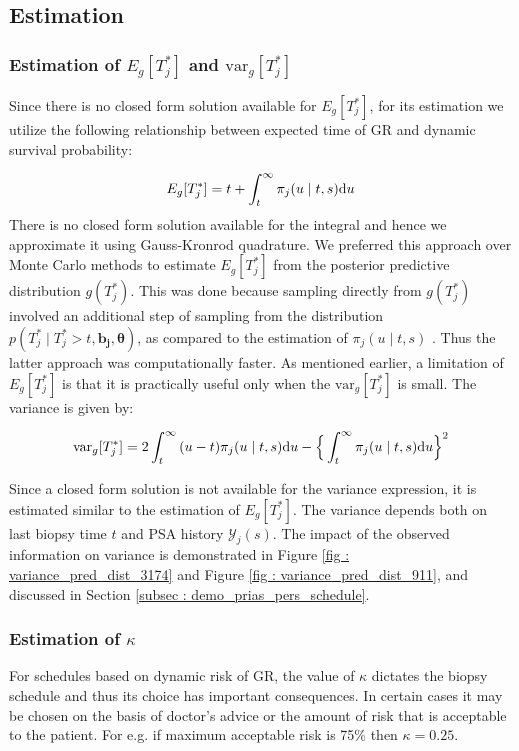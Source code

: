 
\subsection{Estimation}
\subsubsection{Estimation of $E_g[T^*_j]$ and $\mbox{var}_g[T^*_j]$}
Since there is no closed form solution available for $E_g[T^*_j]$, for its estimation we utilize the following relationship between expected time of GR and dynamic survival probability:

\begin{equation}
\label{eq : expected_time_survprob}
E_g[T^*_j] = t + \int_t^\infty \pi_j(u \mid t, s) \rmn{d} u
\end{equation}
There is no closed form solution available for the integral and hence we approximate it using Gauss-Kronrod quadrature. We preferred this approach over Monte Carlo methods to estimate $E_g[T^*_j]$ from the posterior predictive distribution $g(T^*_j)$. This was done because sampling directly from $g(T^*_j)$ involved an additional step of sampling from the distribution $p(T^*_j \mid T^*_j > t, \boldsymbol{b_j}, \boldsymbol{\theta})$, as compared to the estimation of $\pi_j(u \mid t, s)$ \citep{rizopoulos2011dynamic}. Thus the latter approach was computationally faster. As mentioned earlier, a limitation of $E_g[T^*_j]$ is that it is practically useful only when the $\mbox{var}_g[T^*_j]$ is small. The variance is given by:

\begin{equation}
\label{eq : var_time_survprob}
\mbox{var}_g[T^*_j] = 2 \int_t^\infty {(u-t) \pi_j(u \mid t, s) \rmn{d} u} - \Big\{\int_t^\infty \pi_j(u \mid t, s) \rmn{d} u\Big\}^2
\end{equation}

Since a closed form solution is not available for the variance expression, it is estimated similar to the estimation of $E_g[T^*_j]$. The variance depends both on last biopsy time $t$ and PSA history $\mathcal{Y}_j(s)$. The impact of the observed information on variance is demonstrated in Figure \ref{fig : variance_pred_dist_3174} and Figure \ref{fig : variance_pred_dist_911}, and discussed in Section \ref{subsec : demo_prias_pers_schedule}.

\subsubsection{Estimation of $\kappa$}
\label{subsubsec : kappa_estimation}
For schedules based on dynamic risk of GR, the value of $\kappa$ dictates the biopsy schedule and thus its choice has important consequences. In certain cases it may be chosen on the basis of doctor's advice or the amount of risk that is acceptable to the patient. For e.g. if maximum acceptable risk is 75\% then $\kappa = 0.25$.

